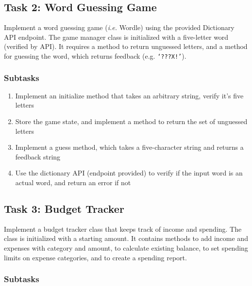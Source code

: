 \subsection{Task 2: Word Guessing Game}

Implement a word guessing game (\textit{i.e.} Wordle) using the provided Dictionary API endpoint. The game manager class is initialized with a five-letter word (verified by API). It requires a method to return unguessed letters, and a method for guessing the word, which returns feedback (e.g. \verb|‘???X!’|).

\subsubsection{Subtasks}

\begin{enumerate}
    \item Implement an initialize method that takes an arbitrary string, verify it’s five letters
    \item Store the game state, and implement a method to return the set of unguessed letters
    \item Implement a guess method, which takes a five-character string and returns a feedback string
    \item Use the dictionary API (endpoint provided) to verify if the input word is an actual word, and return an error if not
\end{enumerate}

\subsection{Task 3: Budget Tracker}

Implement a budget tracker class that keeps track of income and spending. The class is initialized with a starting amount. It contains methods to add income and expenses with category and amount, to calculate existing balance, to set spending limits on expense categories, and to create a spending report.

\subsubsection{Subtasks}

